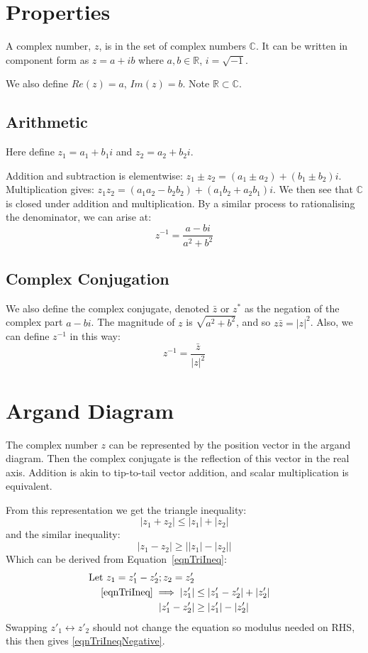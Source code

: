 \documentclass[../Main.tex]{subfiles}
\begin{document}
\section{Properties}
A complex number, $z$, is in the set of complex numbers $\mathbb{C}$. It can be written in component form as $z=a+ib$ where $a, b \in \mathbb{R}$, $i = \sqrt{-1}$.\par
We also define $Re(z) = a$, $Im(z) = b$. Note $\mathbb{R} \subset \mathbb{C}$.
\subsection{Arithmetic}
Here define $z_1 = a_1 + b_1 i$ and $z_2 = a_2 + b_2 i$.\par
Addition and subtraction is elementwise: $z_1 \pm z_2 = (a_1 \pm a_2) + (b_1 \pm b_2)i$.
Multiplication gives: $z_1 z_2 = (a_1 a_2 - b_2 b_2) + (a_1 b_2 + a_2 b_1) i$.
We then see that $\mathbb{C}$ is closed under addition and multiplication.
By a similar process to rationalising the denominator, we can arise at:
\begin{equation}
    z^{-1} = \frac{a - b i}{a^2 + b^2}
\end{equation}
\subsection{Complex Conjugation}
We also define the complex conjugate, denoted $\bar{z}$ or $z^*$ as the negation of the complex part $a - b i$. The magnitude of $z$ is $\sqrt{a^2 + b^2}$, and so $z\bar{z} = |z|^2$. Also, we can define $z^{-1}$ in this way:
\begin{equation*}
    z^{-1} = \frac{\bar{z}}{|z|^2}
\end{equation*}
\section{Argand Diagram}
The complex number $z$ can be represented by the position vector in the argand diagram. Then the complex conjugate is the reflection of this vector in the real axis. Addition is akin to tip-to-tail vector addition, and scalar multiplication is equivalent.\par
From this representation we get the triangle inequality:
\begin{equation}
    |z_1 + z_2| \leq |z_1| + |z_2|
    \label{eqnTriIneq}
\end{equation}
and the similar inequality:
\begin{equation}
    |z_1 - z_2| \geq \left||z_1| - |z_2|\right|
    \label{eqnTriIneqNegative}
\end{equation}
Which can be derived from Equation~\ref{eqnTriIneq}:
\begin{align*}
    \text{Let } z_1 = z'_1 - z'_2; z_2 = z'_2 \\
    \ref{eqnTriIneq} \implies |z'_1| &\leq |z'_1 - z'_2| + |z'_2| \\
    |z'_1 - z'_2| &\geq |z'_1| - |z'_2|
\end{align*}
Swapping $z'_1 \leftrightarrow z'_2$ should not change the equation so modulus needed on RHS, this then gives \ref{eqnTriIneqNegative}.
\end{document}
